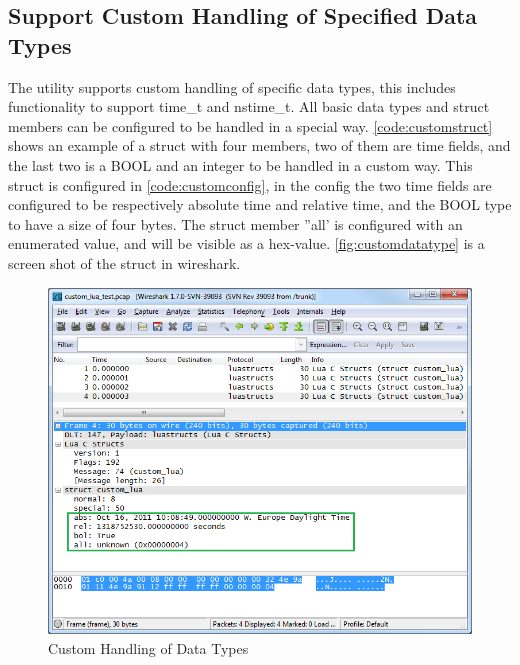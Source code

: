 \subsection{Support Custom Handling of Specified Data Types}
The \gls{utility} supports custom handling of specific data types, this includes 
functionality to support  time\_t and nstime\_t. All basic data types and 
\gls{struct} \glspl{member} can be configured to be handled in a special way. 
\autoref{code:customstruct} shows an example of a \gls{struct} with four \glspl{member}, two 
of them are time fields, and the last two is a BOOL and an \gls{integer} to be 
handled in a custom way. This \gls{struct} is configured in 
\autoref{code:customconfig}, in the config the two time fields are configured 
to be respectively absolute time and relative time, and the BOOL type to have 
a size of four bytes. The \gls{struct} \gls{member} ''all' is configured with an enumerated 
value, and will be visible as a hex-value. \autoref{fig:customdatatype} is a 
screen shot of the \gls{struct} in \Gls{wireshark}.

\begin{figure}[htb]
	\center
	\includegraphics[width=\textwidth]{./sprints/img/wireshark_custom}
	\caption{Custom Handling of Data Types\label{fig:customdatatype}}
\end{figure}



